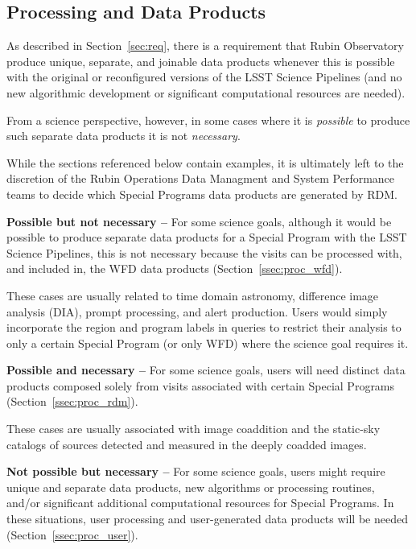 \subsection{Processing and Data Products}

As described in Section~\ref{sec:req}, there is a requirement that 
Rubin Observatory produce unique, separate, and joinable data products 
whenever this is possible with the original or reconfigured versions of the 
LSST Science Pipelines (and no new algorithmic development or significant 
computational resources are needed).

From a science perspective, however, in some cases where it is \emph{possible} 
to produce such separate data products it is not \emph{necessary}.

While the sections referenced below contain examples, it is ultimately left to 
the discretion of the Rubin Operations Data Managment and System Performance teams to decide which Special Programs data products are generated by RDM.

\textbf{Possible but not necessary -- } 
For some science goals, although it would be possible to produce separate 
data products for a Special Program with the LSST Science Pipelines, this 
is not necessary because the visits can be processed with, and included in, 
the WFD data products (Section~\ref{ssec:proc_wfd}).

These cases are usually related to time domain astronomy, difference image
analysis (DIA), prompt processing, and alert production.
Users would simply incorporate the region and program labels in queries to restrict 
their analysis to only a certain Special Program (or only WFD) where the 
science goal requires it.

\textbf{Possible and necessary -- }
For some science goals, users will need distinct data products composed solely from visits associated with certain Special Programs (Section~\ref{ssec:proc_rdm}).

These cases are usually associated with image coaddition and the static-sky catalogs 
of sources detected and measured in the deeply coadded images. 

\textbf{Not possible but necessary -- }
For some science goals, users might require unique and separate data products, 
new algorithms or processing routines, and/or significant additional 
computational resources for Special Programs.
In these situations, user processing and user-generated data products will be 
needed (Section~\ref{ssec:proc_user}).


